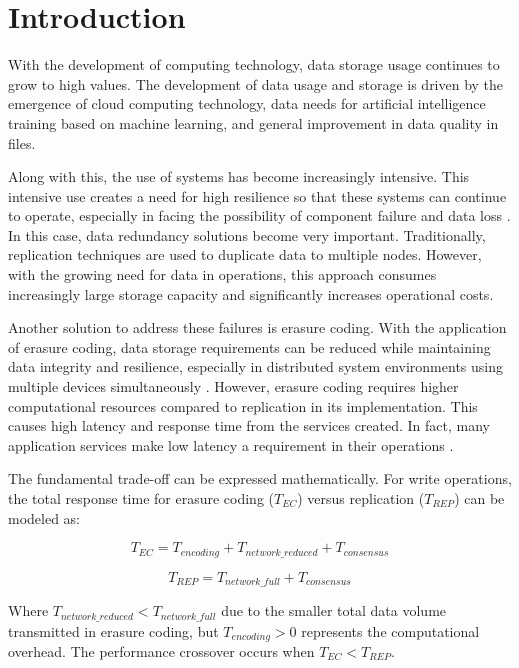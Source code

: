 \section{Introduction}

With the development of computing technology, data storage usage continues to grow to high values. The development of data usage and storage is driven by the emergence of cloud computing technology, data needs for artificial intelligence training based on machine learning, and general improvement in data quality in files.

Along with this, the use of systems has become increasingly intensive. This intensive use creates a need for high resilience so that these systems can continue to operate, especially in facing the possibility of component failure and data loss \cite{weatherspoon2002erasure}. In this case, data redundancy solutions become very important. Traditionally, replication techniques are used to duplicate data to multiple nodes. However, with the growing need for data in operations, this approach consumes increasingly large storage capacity and significantly increases operational costs.

Another solution to address these failures is erasure coding. With the application of erasure coding, data storage requirements can be reduced while maintaining data integrity and resilience, especially in distributed system environments using multiple devices simultaneously \cite{balaji2018erasure}. However, erasure coding requires higher computational resources compared to replication in its implementation. This causes high latency and response time from the services created. In fact, many application services make low latency a requirement in their operations \cite{dean2013tail}.

The fundamental trade-off can be expressed mathematically. For write operations, the total response time for erasure coding ($T_{EC}$) versus replication ($T_{REP}$) can be modeled as:

\begin{equation}
T_{EC} = T_{encoding} + T_{network\_reduced} + T_{consensus}
\end{equation}

\begin{equation}
T_{REP} = T_{network\_full} + T_{consensus}
\end{equation}

Where $T_{network\_reduced} < T_{network\_full}$ due to the smaller total data volume transmitted in erasure coding, but $T_{encoding} > 0$ represents the computational overhead. The performance crossover occurs when $T_{EC} < T_{REP}$.

